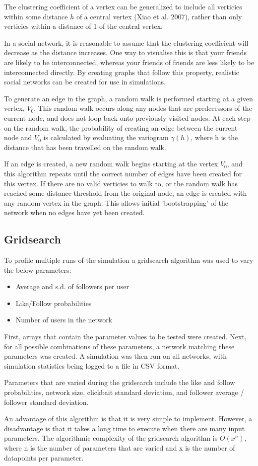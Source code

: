 \documentclass{article}
\begin{document}
The clustering coefficient of a vertex can be generalized to include all verticies
within some distance $h$ of a central vertex (Xiao et al. 2007), rather than
only verticies within a distance of 1 of the central vertex.

In a social network, it is reasonable to assume that the clustering
coefficient will decrease as the distance increases.
One way to visualise this is that your friends are likely to be interconnected,
whereas your friends of friends are less likely to be interconnected directly.
By creating graphs that follow this property, realistic social networks
can be created for use in simulations.

To generate an edge in the graph, a random walk is performed starting at a given vertex, $V_0$.
This random walk occurs along any nodes that are predecessors of the current node,
and does not loop back onto previously visited nodes.
At each step on the random walk, the probability of creating an edge between the current node and $V_0$
is calculated by evaluating the variogram $\gamma (h)$, where h is the distance that has been travelled on the random walk.

If an edge is created, a new random walk begins starting at the vertex $V_0$,
and this algorithm repeats until the correct number of edges have been created
for this vertex.
If there are no valid verticies to walk to,
or the random walk has reached some distance threshold from the original node,
an edge is created with any random vertex in the graph. This allows initial
'bootstrapping' of the network when no edges have yet been created.\\

\subsection{Gridsearch}

To profile multiple runs of the simulation a gridsearch algorithm was used
to vary the below parameters:
\begin{itemize}
\item Average and s.d. of followers per user
\item Like/Follow probabilities
\item Number of users in the network
\end{itemize}

First, arrays that contain the parameter values to be tested were created.
Next, for all possible combinations of these parameters, a network
matching these parameters was created. A simulation was then run on all networks,
with simulation statistics being logged to a file in CSV format.

Parameters that are varied during the gridsearch include the like and follow probabilities,
network size, clickbait standard deviation, and
follower average / follower standard deviation.

An advantage of this algorithm is that it is very simple to implement.
However, a disadvantage is that it takes a long time to execute when there are many input parameters.
The algorithmic complexity of the gridsearch algorithm
is $O(x^n)$, where n is the number of parameters that are varied and x is the number
of datapoints per parameter.
\end{document}
